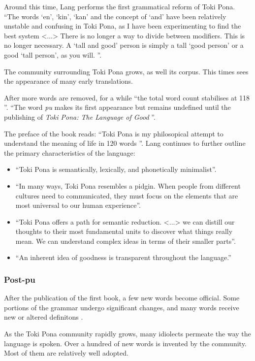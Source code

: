 \documentclass[14pt, a4paper]{extreport}
\begin{document}
Around this time, Lang performs the first grammatical reform of Toki Pona. ``The words `en', `kin', `kan' and the concept of `and' have been relatively unstable and confusing in Toki Pona, as I have been experimenting to find the best system <...> There is no longer a way to divide between modifiers. This is no longer necessary. A `tall and good' person is simply a tall `good person' or a good `tall person', as you will. \parencite{enkinkan}''.

The community surrounding Toki Pona grows, as well its corpus. This times sees the appearance of many early translations.

After more words are removed, for a while ``the total word count stabilises at 118 \parencite{evo}''.  ``The word \textit{pu} makes its first appearance but remains undefined until the publishing of \textit{Toki Pona: The Language of Good} \parencite{evo}''.

The preface of the book reads: ``Toki Pona is my philosopical attempt to understand the meaning of life in 120 words \parencite{pu}''. Lang continues to further outline the primary characteristics of the language:

\begin{itemize}
  \item ``Toki Pona is semantically, lexically, and phonetically minimalist''.
  \item ``In many ways, Toki Pona resembles a pidgin. When people from different cultures need to communicated, they must focus on the elements that are most universal to our human experience''.
  \item ``Toki Pona offers a path for semantic reduction. <...> we can distill our thoughts to their most fundamental units to discover what things really mean. We can understand complex ideas in terms of their smaller parts''.
  \item ``An inherent idea of goodness is transparent throughout the language.''
\end{itemize}

      \subsubsection{Post-pu}
After the publication of the first book, a few new words become official. Some portions of the grammar undergo significant changes, and many words receive new or altered definitons \parencite{evo}.

As the Toki Pona community rapidly grows, many idiolects permeate the way the language is spoken. Over a hundred of new words is invented by the community. Most of them are relatively well adopted.
\end{document}
